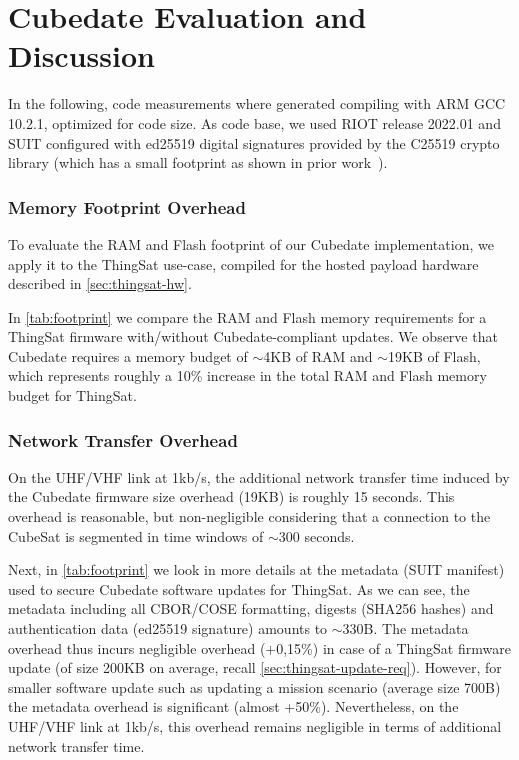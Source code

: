 \section{Cubedate Evaluation and Discussion}
\label{sec:evaluation}


In the following, code measurements where generated compiling with ARM GCC 10.2.1,
optimized for code size. As code base, we used RIOT release 2022.01 and SUIT configured
with ed25519 digital signatures provided by the C25519 crypto library (which has a small
footprint as shown in prior work~\cite{zandberg2019secure}).

\subsubsection{Memory Footprint Overhead}

To evaluate the RAM and Flash footprint of our Cubedate implementation, we apply it to
the ThingSat use-case, compiled for the hosted payload hardware described in \autoref{sec:thingsat-hw}.

In \autoref{tab:footprint} we compare the RAM and Flash memory requirements for a ThingSat firmware with/without Cubedate-compliant updates.
We observe that Cubedate requires a memory budget of $\sim$4KB of RAM and $\sim$19KB of Flash, which represents roughly a 10\%
increase in the total RAM and Flash memory budget for ThingSat.

\subsubsection{Network Transfer Overhead}
On the UHF/VHF link at 1kb/s, the additional network transfer time induced by the Cubedate firmware size overhead (19KB) is roughly 15 seconds.
This overhead is reasonable, but non-negligible considering that a connection to the CubeSat is segmented in time windows of $\sim$300 seconds.

Next, in \autoref{tab:footprint} we look in more details at the metadata (SUIT manifest) used to secure Cubedate software updates for ThingSat.
As we can see, the metadata including all CBOR/COSE formatting, digests (SHA256 hashes) and authentication data (ed25519 signature) amounts to $\sim$330B.
The metadata overhead thus incurs negligible overhead (+0,15\%) in case of a ThingSat firmware update (of size 200KB on average, recall
\autoref{sec:thingsat-update-req}). However, for smaller software update such as updating a mission scenario (average size 700B) the metadata
overhead is significant (almost +50\%). Nevertheless, on the UHF/VHF link at 1kb/s, this overhead remains negligible in terms of additional
network transfer time.

